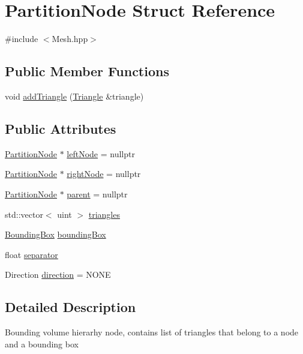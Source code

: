 \hypertarget{struct_partition_node}{}\section{Partition\+Node Struct Reference}
\label{struct_partition_node}


{\ttfamily \#include $<$Mesh.\+hpp$>$}

\subsection*{Public Member Functions}
\begin{DoxyCompactItemize}
\item 
void \hyperlink{struct_partition_node_aaababc44867907150c7371d071e7ec8d}{add\+Triangle} (\hyperlink{struct_triangle}{Triangle} \&triangle)
\end{DoxyCompactItemize}
\subsection*{Public Attributes}
\begin{DoxyCompactItemize}
\item 
\hyperlink{struct_partition_node}{Partition\+Node} $\ast$ \hyperlink{struct_partition_node_a82bfd35cfcfc913ab41b2cb8c3c2f499}{left\+Node} = nullptr
\item 
\hyperlink{struct_partition_node}{Partition\+Node} $\ast$ \hyperlink{struct_partition_node_a673d8267a9eb0a5c77bdfc48b00f1e16}{right\+Node} = nullptr
\item 
\hyperlink{struct_partition_node}{Partition\+Node} $\ast$ \hyperlink{struct_partition_node_a4d66482e5a4c91717fd0d935557ceb14}{parent} = nullptr
\item 
std\+::vector$<$ uint $>$ \hyperlink{struct_partition_node_a45bf7beca48bcb4533d7f7d21e0df440}{triangles}
\item 
\hyperlink{struct_bounding_box}{Bounding\+Box} \hyperlink{struct_partition_node_a7f1efc38b6bbdf4cc2f8e36574bbf276}{bounding\+Box}
\item 
float \hyperlink{struct_partition_node_aa1c74a380fa906533ad5e7649293e711}{separator}
\item 
Direction \hyperlink{struct_partition_node_a5e861a43672acf654394a15b012df231}{direction} = N\+O\+N\+E
\end{DoxyCompactItemize}


\subsection{Detailed Description}
Bounding volume hierarhy node, contains list of triangles that belong to a node and a bounding box 

